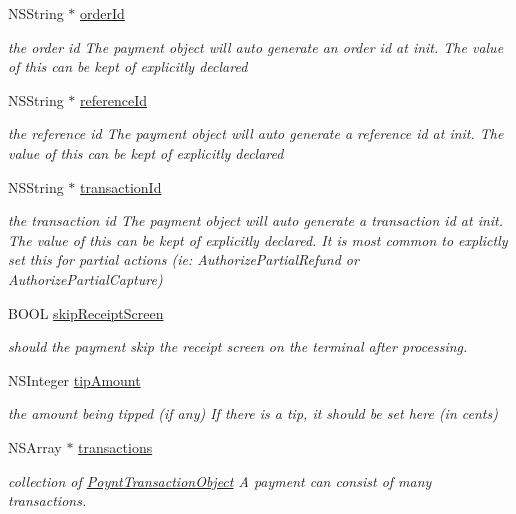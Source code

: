 \begin{DoxyCompactItemize}
N\+S\+String $\ast$ \hyperlink{interface_poynt_payment_object_aac2b120e80b4b9e69c3a577c4f31ed31}{order\+Id}
\begin{DoxyCompactList}\small\item\em the order id  The payment object will auto generate an order id at init. The value of this can be kept of explicitly declared \end{DoxyCompactList}\item 
N\+S\+String $\ast$ \hyperlink{interface_poynt_payment_object_ab9a55f2b8aef17222c41f356957e2513}{reference\+Id}
\begin{DoxyCompactList}\small\item\em the reference id  The payment object will auto generate a reference id at init. The value of this can be kept of explicitly declared \end{DoxyCompactList}\item 
N\+S\+String $\ast$ \hyperlink{interface_poynt_payment_object_aacd11580c330a78310c344d78baecf8c}{transaction\+Id}
\begin{DoxyCompactList}\small\item\em the transaction id  The payment object will auto generate a transaction id at init. The value of this can be kept of explicitly declared. It is most common to explictly set this for partial actions (ie\+: Authorize\+Partial\+Refund or Authorize\+Partial\+Capture) \end{DoxyCompactList}\item 
B\+O\+OL \hyperlink{interface_poynt_payment_object_a065f8677ebd1da13c2f57bd6cbbf3d7c}{skip\+Receipt\+Screen}
\begin{DoxyCompactList}\small\item\em should the payment skip the receipt screen on the terminal after processing. \end{DoxyCompactList}\item 
N\+S\+Integer \hyperlink{interface_poynt_payment_object_ae4a2e64d79032bc8bb25305486b23859}{tip\+Amount}
\begin{DoxyCompactList}\small\item\em the amount being tipped (if any)  If there is a tip, it should be set here (in cents) \end{DoxyCompactList}\item 
N\+S\+Array $\ast$ \hyperlink{interface_poynt_payment_object_a12474d50a1838843bcc1cacbbc30c4d2}{transactions}
\begin{DoxyCompactList}\small\item\em collection of \hyperlink{interface_poynt_transaction_object}{Poynt\+Transaction\+Object}  A payment can consist of many transactions. \end{DoxyCompactList}\item 

\end{DoxyCompactItemize}

